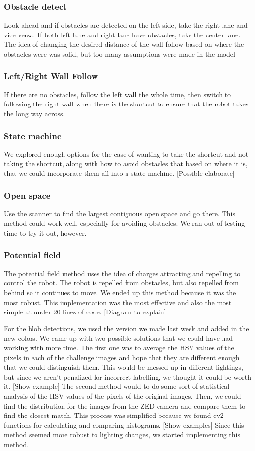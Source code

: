 \documentclass[journal, a4paper]{IEEEtran}
\begin{document}
\subsubsection{Obstacle detect}
Look ahead and if obstacles are detected on the left side, take the right lane and vice versa. If both left lane and right lane have obstacles, take the center lane. The idea of changing the desired distance of the wall follow based on where the obstacles were was solid, but too many assumptions were made in the model
\subsubsection{Left/Right Wall Follow}
If there are no obstacles, follow the left wall the whole time, then switch to following the right wall when there is the shortcut to ensure that the robot takes the long way across.
\subsubsection{State machine}
We explored enough options for the case of wanting to take the shortcut and not taking the shortcut, along with how to avoid obstacles that based on where it is, that we could incorporate them all into a state machine. [Possible elaborate]
\subsubsection{Open space}
Use the scanner to find the largest contiguous open space and go there. This method could work well, especially for avoiding obstacles. We ran out of testing time to try it out, however. 
\subsubsection{Potential field}
The potential field method uses the idea of charges attracting and repelling to control the robot. The robot is repelled from obstacles, but also repelled from behind so it continues to move. We ended up this method because it was the most robust. This implementation was the most effective and also the most simple at under 20 lines of code. [Diagram to explain]

For the blob detections, we used the version we made last week and added in the new colors. We came up with two possible solutions that we could have had working with more time. The first one was to average the HSV values of the pixels in each of the challenge images and hope that they are different enough that we could distinguish them. This would be messed up in different lightings, but since we aren’t penalized for incorrect labelling, we thought it could be worth it. [Show example] The second method would to do some sort of statistical analysis of the HSV values of the pixels of the original images. Then, we could find the distribution for the images from the ZED camera and compare them to find the closest match. This process was simplified because we found cv2 functions for calculating and comparing histograms. [Show examples] Since this method seemed more robust to lighting changes, we started implementing this method. 
\end{document}

